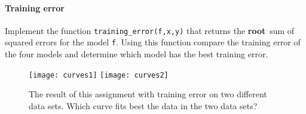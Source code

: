 \documentclass[a4paper,10pt]{article}
\begin{document}
\paragraph{Training error} Implement the function
\lstinline{training_error(f,x,y)} that returns the \color{red}
{\bf root}\color{black}\ sum of squared
  errors for the model \lstinline{f}. Using this function compare the
  training error of the four models and determine which model has the
  best training error.



\begin{figure}[tb]
\centering
\texttt{[image: curves1]}
\texttt{[image: curves2]}
\caption{The result of this assignment with training error on two
  different data sets. Which curve fits best the data in the two data sets? }
\end{figure}
\end{document}
